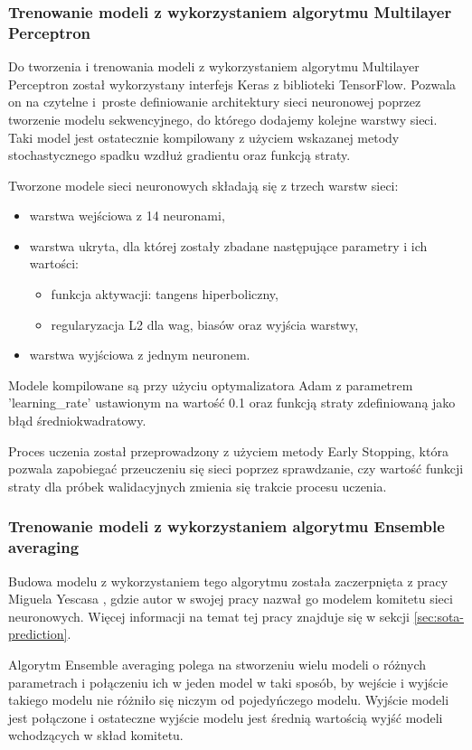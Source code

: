 \subsubsection{Trenowanie modeli z wykorzystaniem algorytmu Multilayer Perceptron}\label{sec:mlp-train}
Do tworzenia i trenowania modeli z wykorzystaniem algorytmu Multilayer Perceptron został wykorzystany interfejs Keras z biblioteki TensorFlow. Pozwala on na czytelne i~proste definiowanie architektury sieci neuronowej poprzez tworzenie modelu sekwencyjnego, do którego dodajemy kolejne warstwy sieci. Taki model jest ostatecznie kompilowany z użyciem wskazanej metody stochastycznego spadku wzdłuż gradientu oraz funkcją straty.

Tworzone modele sieci neuronowych składają się z trzech warstw sieci:
\begin{itemize}
    \item warstwa wejściowa z 14 neuronami,
    \item warstwa ukryta, dla której zostały zbadane następujące parametry i ich wartości:
    \begin{itemize}
        \item funkcja aktywacji: tangens hiperboliczny,
        \item regularyzacja L2 dla wag, biasów oraz wyjścia warstwy,
    \end{itemize}
    \item warstwa wyjściowa z jednym neuronem.
\end{itemize}
Modele kompilowane są przy użyciu optymalizatora Adam z parametrem 'learning\_rate' ustawionym na wartość 0.1 oraz funkcją straty zdefiniowaną jako błąd średniokwadratowy.

Proces uczenia został przeprowadzony z użyciem metody Early Stopping, która pozwala zapobiegać przeuczeniu się sieci poprzez sprawdzanie, czy wartość funkcji straty dla próbek walidacyjnych zmienia się trakcie procesu uczenia. 

\subsubsection{Trenowanie modeli z wykorzystaniem algorytmu Ensemble averaging}\label{sec:ea-train}
Budowa modelu z wykorzystaniem tego algorytmu została zaczerpnięta z pracy Miguela Yescasa \cite{YESCAS2001162}, gdzie autor w swojej pracy nazwał go modelem komitetu sieci neuronowych. Więcej informacji na temat tej pracy znajduje się w sekcji \ref{sec:sota-prediction}.

Algorytm Ensemble averaging polega na stworzeniu wielu modeli o różnych parametrach i połączeniu ich w jeden model w taki sposób, by wejście i wyjście takiego modelu nie różniło się niczym od pojedyńczego modelu. Wyjście modeli jest połączone i ostateczne wyjście modelu jest średnią wartością wyjść modeli wchodzących w skład komitetu.

